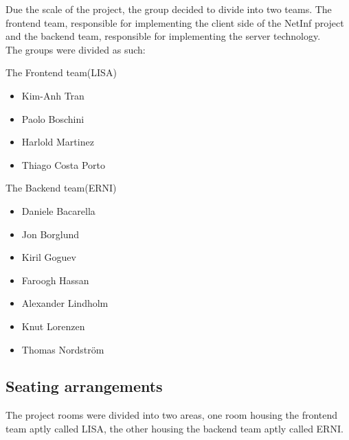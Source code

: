 Due the scale of the project, the group decided to divide into two teams. 
The frontend team, responsible for implementing the client side of the NetInf project and the backend team, responsible for implementing the server technology.\\

The groups were divided as such:

The Frontend team(LISA)

\begin{itemize}
\item Kim-Anh Tran
\item Paolo Boschini
\item Harlold Martinez
\item Thiago Costa Porto
\end{itemize}

The Backend team(ERNI)

\begin {itemize}
\item Daniele Bacarella
\item Jon Borglund
\item Kiril Goguev
\item Faroogh Hassan
\item Alexander Lindholm
\item Knut Lorenzen
\item Thomas Nordstr\"om
\end {itemize}

\subsection{Seating arrangements}

The project rooms were divided into two areas, one room housing the frontend team aptly called LISA, the other housing the backend team aptly called ERNI. 